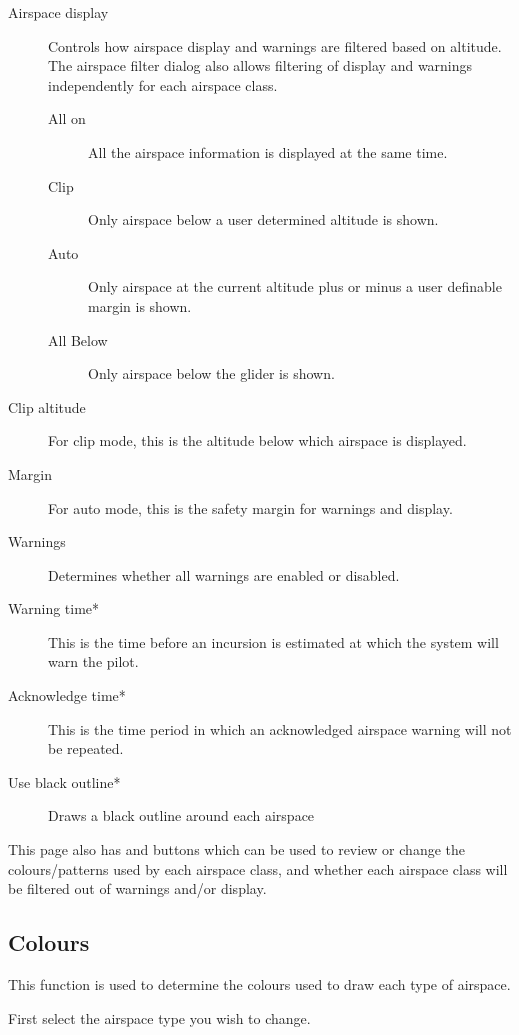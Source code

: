 \documentclass[a4paper,12pt]{refrep}
\begin{document}
\begin{description}
\item[Airspace display] Controls how airspace display and warnings are filtered based on altitude.  The airspace filter dialog also allows filtering
 of display and warnings independently for each airspace class.
\begin{description}
\item[All on] All the airspace information is displayed at the same time.
\item[Clip] Only airspace below a user determined altitude is shown.
\item[Auto] Only airspace at the current altitude plus or minus a user definable margin is shown.
\item[All Below]  Only airspace below the glider is shown.
\end{description}
\item[Clip altitude] For clip mode, this is the altitude below which airspace is displayed.
\item[Margin] For auto mode, this is the safety margin for warnings and display.
\item[Warnings] Determines whether all warnings are enabled or disabled.
\item[Warning time*]  This is the time before an incursion is estimated at
  which the system will warn the pilot.
\item[Acknowledge time*]  This is the time period in which an acknowledged airspace warning will not be repeated.
\item[Use black outline*] Draws a black outline around each airspace
\end{description}

This page also has  and  buttons which
can be used to review or change the colours/patterns used by each
airspace class, and whether each airspace class will be filtered out
of warnings and/or display.  

\subsection*{Colours}
This function is used to determine the colours used to draw each type of
airspace.

First select the airspace type you wish to change.
\end{document}
